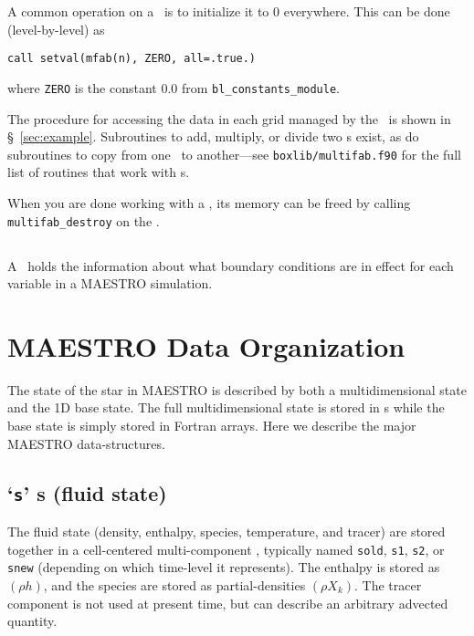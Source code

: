 A common operation on a \multifab\ is to initialize it to $0$
everywhere.  This can be done (level-by-level) as
\begin{lstlisting}[language={[95]fortran},mathescape=false]
call setval(mfab(n), ZERO, all=.true.)
\end{lstlisting}
where {\tt ZERO} is the constant 0.0 from {\tt bl\_constants\_module}.

The procedure for accessing the data in each grid managed by the \multifab\
is shown in \S~\ref{sec:example}.  
Subroutines to add, multiply, or divide two \multifab s exist, as do
subroutines to copy from one \multifab\ to another---see {\tt boxlib/multifab.f90}
for the full list of routines that work with \multifab s.


When you are done working with a \multifab, its memory can be freed by
calling {\tt multifab\_destroy} on the \multifab.




\subsection{\bctower}

A \bctower\ holds the information about what boundary conditions are
in effect for each variable in a MAESTRO simulation.  

\section{MAESTRO Data Organization}

The state of the star in MAESTRO is described by both a
multidimensional state and the 1D base state.  The full
multidimensional state is stored in \multifab s while the base state
is simply stored in Fortran arrays.  Here we describe the
major MAESTRO data-structures.




\subsection{`{\tt s}' \multifab s (fluid state)}

The fluid state (density, enthalpy, species, temperature, and tracer)
are stored together in a cell-centered multi-component \multifab,
typically named {\tt sold}, {\tt s1}, {\tt s2}, or {\tt snew}
(depending on which time-level it represents).  The enthalpy is stored
as $(\rho h)$, and the species are stored as partial-densities $(\rho
X_k)$.  The tracer component is not used at present time, but can
describe an arbitrary advected quantity.

